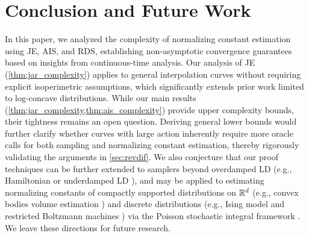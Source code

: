 \section{Conclusion and Future Work}
\label{sec:conc}
In this paper, we analyzed the complexity of normalizing constant estimation using JE, AIS, and RDS, establishing non-asymptotic convergence guarantees based on insights from continuous-time analysis. Our analysis of JE (\cref{thm:jar_complexity}) applies to general interpolation curves without requiring explicit isoperimetric assumptions, which significantly extends prior work limited to log-concave distributions. While our main results (\cref{thm:jar_complexity,thm:ais_complexity}) provide upper complexity bounds, their tightness remains an open question. Deriving general lower bounds would further clarify whether curves with large action inherently require more oracle calls for both sampling and normalizing constant estimation, thereby rigorously validating the arguments in \cref{sec:revdif}. We also conjecture that our proof techniques can be further extended to samplers beyond overdamped LD (e.g., Hamiltonian or underdamped LD \citep{sohl2012hamiltonian}), and may be applied to estimating normalizing constants of compactly supported distributions on $\mathbb{R}^d$ (e.g., convex bodies volume estimation \citep{cousins2018gaussian}) and discrete distributions (e.g., Ising model and restricted Boltzmann machines \citep{huber2015approximation,krause2020algorithms}) via the Poisson stochastic integral framework \citep{ren2025how,ren2025fast}. We leave these directions for future research.